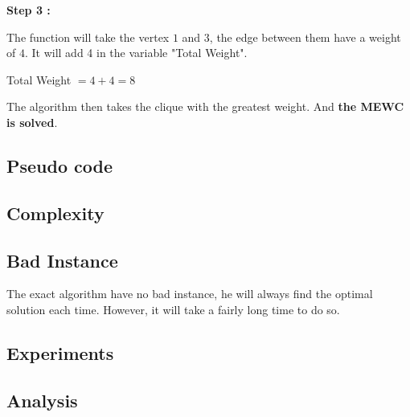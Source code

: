     \hspace*{1cm}  \textbf{Step 3 :}
    \\
    \begin{minipage}{0.4\textwidth}
    \end{minipage}
    \begin{minipage}{0.6\textwidth}
        The function will take the vertex $1$ and $3$, the edge between them have a weight of $4$. It will add 4 in the variable "Total Weight".
    \end{minipage}
    \begin{center}
        Total Weight $= 4 + 4 = 8$
    \end{center}

    The algorithm then takes the clique with the greatest weight. And \textbf{the MEWC is solved}.


\subsection{Pseudo code}


\subsection{Complexity}


\subsection{Bad Instance}
    
    The exact algorithm have no bad instance, he will always find the optimal solution each time. However, it will take a fairly long time to do so.


\subsection{Experiments}


\subsection{Analysis}

\newpage